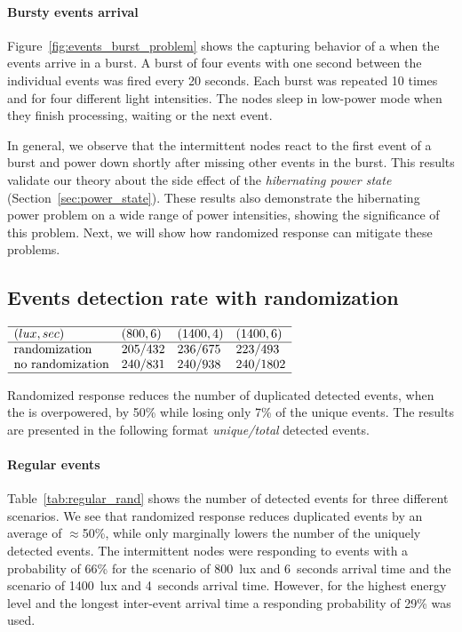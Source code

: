 \paragraph{Bursty events arrival}
Figure~\ref{fig:events_burst_problem} shows the capturing behavior of a \sys when the events arrive in a burst. A burst of four events with one second between the individual events was fired every 20 seconds. Each burst was repeated 10 times and for four different light intensities. The nodes sleep in low-power mode when they finish processing, waiting or the next event. 

In general, we observe that the intermittent nodes react to the first event of a burst and power down shortly after missing other events in the burst. This results validate our theory about the side effect of the \textit{hibernating power state} (Section~\ref{sec:power_state}). These results also demonstrate the hibernating power problem on a wide range of power intensities, showing the significance of this problem. Next, we will show how randomized response can mitigate these problems. 

\subsection{Events detection rate with randomization}
\begin{table}
	\centering
    $
    \begin{array}{llll}\hline
     (lux,sec) & (800,6) & (1400,4) &(1400,6)\\\hline
    \text{randomization} &  205/432 & 236/675 & 223/493 \\
    \text{no randomization} & 240/831 &  240/938 & 240/1802 \\\hline
    \end{array}
    $
    \caption{Randomized response reduces the number of duplicated detected events,  when the \sys is overpowered, by 50\% while losing only 7\% of the unique events. The results are presented in the following format \textit{unique/total} detected events.}
    \label{tab:regular_rand}
\end{table}
%
\paragraph{Regular events} Table~\ref{tab:regular_rand} shows the number of detected events for three different scenarios. We see that randomized response reduces duplicated events by an average of $\approx$50\%, while only marginally lowers the number of the uniquely detected events. The intermittent nodes were responding to events with a probability of 66\% for the scenario of \SI{800}{lux} and \SI{6}{seconds} arrival time and the scenario of \SI{1400}{lux} and \SI{4}{seconds} arrival time. However, for the highest energy level and the longest inter-event arrival time a responding probability of 29\% was used.

